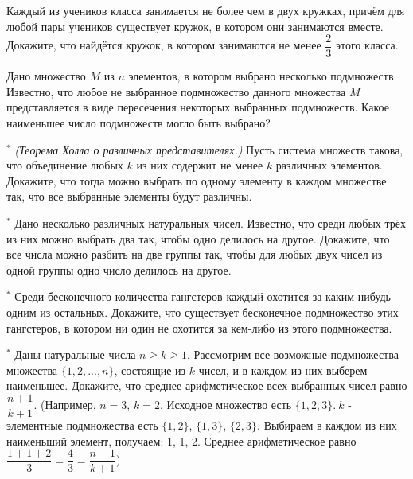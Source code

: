 
\begin{thm}
Каждый из учеников класса занимается не более чем в двух кружках, причём для любой пары учеников существует кружок, в котором они занимаются вместе. Докажите, что найдётся кружок, в котором
занимаются не менее $\dfrac{2}{3}$ этого класса.
\end{thm}

\begin{thm}
Дано множество $M$ из $n$ элементов, в котором выбрано несколько подмножеств. Известно, что любое не выбранное подмножество данного множества $M$ представляется в виде пересечения некоторых выбранных подмножеств. Какое наименьшее число подмножеств могло быть выбрано?
\end{thm}

\begin{thm}$^{\ast}$
\textit{(Теорема Холла о различных представителях.)} Пусть система множеств такова, что объединение любых $k$ из них содержит не менее $k$ различных элементов. Докажите, что тогда можно выбрать по одному элементу в каждом множестве так, что все выбранные элементы будут различны.
\end{thm}

\begin{thm}$^{\ast}$
Дано несколько различных натуральных чисел. Известно, что среди любых трёх из них можно выбрать два так, чтобы одно делилось на другое. Докажите, что все числа можно разбить на две группы так, чтобы для любых двух чисел из одной группы одно число делилось на другое.
\end{thm}

\begin{thm}$^{\ast}$
Среди бесконечного количества гангстеров каждый охотится за каким-нибудь одним из остальных. Докажите, что существует бесконечное подмножество этих гангстеров, в котором ни один не охотится за кем-либо из этого подмножества.
\end{thm}

\begin{thm}$^{\ast}$
Даны натуральные числа $n \geq k \geq 1$. Рассмотрим все возможные подмножества множества $\{1, 2, ... , n\}$, состоящие из $k$ чисел, и в каждом из них выберем наименьшее. Докажите, что среднее арифметическое всех выбранных чисел равно $\dfrac{n+1}{k+1}$. (Например, $n = 3$, $k = 2$. Исходное множество есть $\{1, 2, 3\}.~k$ - элементные подмножества есть $\{1, 2\}$, $\{1, 3\}$, $\{2, 3\}$. Выбираем в каждом из них наименьший элемент, получаем:
1, 1, 2. Среднее арифметическое равно $\dfrac{1+1+2}{3} = \dfrac{4}{3} = \dfrac{n+1}{k+1}$)
\end{thm}